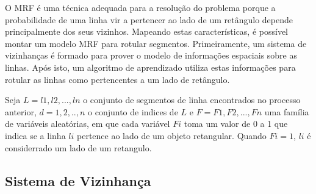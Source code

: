 O MRF é uma técnica adequada para a resolução do problema porque a probabilidade de uma linha vir a pertencer ao lado de um retângulo depende principalmente dos seus vizinhos. Mapeando estas características, é possível montar um modelo MRF para rotular segmentos. Primeiramente, um sistema de vizinhanças é formado para prover o modelo de informações espaciais sobre as linhas. Após isto, um algoritmo de aprendizado utiliza estas informações para rotular as linhas como pertencentes a um lado de retângulo.

Seja $L = {l1,l2,...,ln}$ o conjunto de segmentos de linha encontrados no processo anterior, $d = {1,2,..,n}$ o conjunto de indices de $L$ e $F = {F1,F2,...,Fn}$ uma família de variáveis aleatórias, em que cada variável $Fi$ toma um valor de 0 a 1 que indica se a linha $li$ pertence ao lado de um objeto retangular. Quando $Fi = 1$, $li$ é considerrado um lado de um retangulo.

\subsection{Sistema de Vizinhança}


